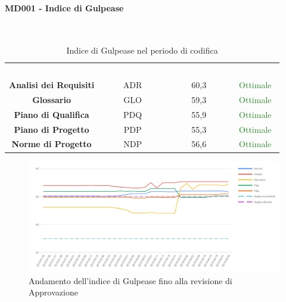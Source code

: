 \paragraph{MD001 - Indice di Gulpease}\mbox{}\\[0,3cm]
\begin{table}[H]
	\centering
	\begin{tabular}{cccc}
	\rowcolor{greySWEight}
	\textcolor{white}{\textbf{Documento}} & 
	\textcolor{white}{\textbf{Abbreviazione}} &
	\textcolor{white}{\textbf{Valore Indice}}&
	\textcolor{white}{\textbf{Riscontro}}\\
	
	\textbf{Analisi dei Requisiti} & ADR & 60,3 & \textcolor{ForestGreen}{Ottimale} \\
	\textbf{Glossario} & GLO & 59,3 & \textcolor{ForestGreen}{Ottimale} \\
	\textbf{Piano di Qualifica} & PDQ & 55,9 & \textcolor{ForestGreen}{Ottimale} \\
	\textbf{Piano di Progetto} & PDP & 55,3 & \textcolor{ForestGreen}{Ottimale} \\
	\textbf{Norme di Progetto} & NDP & 56,6 & \textcolor{ForestGreen}{Ottimale} \\

	\end{tabular}
	\caption{Indice di Gulpease nel periodo di codifica}
\end{table}

\begin{figure}[H]
	\includegraphics[width=1\linewidth]{sez/App_Esito/Approvazione/graph/indiceGulpeaseRA.pdf}
	\caption{Andamento dell'indice di Gulpease fino alla revisione di Approvazione}
\end{figure}
\newpage